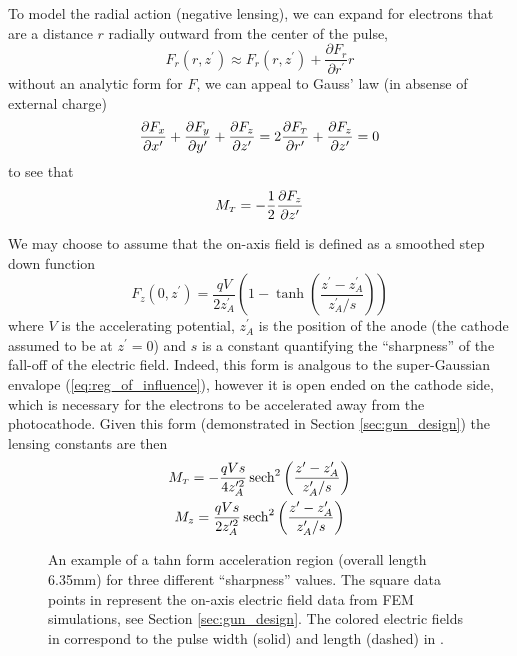 To model the radial action (negative lensing), we can expand for electrons that are a distance $r$ radially outward from the center of the pulse,
\begin{equation}
  F_r(r,z^{\prime}) \approx F_r(r,z^{\prime}) + \frac{\partial F_r}{\partial r^{\prime}} r
\end{equation}
without an analytic form for $F$, we can appeal to Gauss' law (in absense of external charge)
\begin{equation}
  \frac{\partial F_x}{\partial x^{\prime}} + \frac{\partial F_y}{\partial y^{\prime}} + \frac{\partial F_z}{\partial z^{\prime}} = 2 \frac{\partial F_{{\scriptscriptstyle T}}}{\partial r^{\prime}} + \frac{\partial F_z}{\partial z^{\prime}} = 0
\end{equation}
to see that
\begin{equation}
  M_{{\scriptscriptstyle T}} = -\frac{1}{2}\frac{\partial F_z}{\partial z^{\prime}}
\end{equation}

We may choose to assume that the on-axis field is defined as a smoothed step down function
\begin{equation}
  F_z(0,z^{\prime}) = \frac{qV}{2z^{\prime}_A} \left( 1 - \tanh \left( \frac{ z^{\prime} - z^{\prime}_A }{ z^{\prime}_A / s } \right) \right)
\end{equation}
where $V$ is the accelerating potential, $z^{\prime}_A$ is the position of the anode (the cathode assumed to be at $z^{\prime} = 0$) and $s$ is a constant quantifying the ``sharpness'' of the fall-off of the electric field.
Indeed, this form is analgous to the super-Gaussian envalope (\ref{eq:reg_of_influence}), however it is open ended on the cathode side, which is necessary for the electrons to be accelerated away from the photocathode.
Given this form (demonstrated in Section \ref{sec:gun_design}) the lensing constants are then
\begin{gather}
  M_{{\scriptscriptstyle T}} = -\frac{qVs}{4z^{\prime 2}_A} \operatorname{sech}^2 \left( \frac{z^{\prime} - z^{\prime}_A }{ z^{\prime}_A / s } \right) \\
  M_z = \frac{qVs}{2z^{\prime 2}_A} \operatorname{sech}^2 \left( \frac{z^{\prime} - z^{\prime}_A }{ z^{\prime}_A / s } \right)
\end{gather}

\begin{figure}
  \centerline{
    \subfloat[][]{
      \label{fig:field_on_axis}
      
    }
    \subfloat[][]{
      \label{fig:tanh_sharpness}
      
    }
  }
  \caption{
    An example of a tahn form acceleration region (overall length 6.35mm) for three different ``sharpness'' values.
    The square data points in \protect{} represent the on-axis electric field data from FEM simulations, see Section \ref{sec:gun_design}.
    The colored electric fields in \protect{} correspond to the pulse width (solid) and length (dashed) in \protect{}.
  }
  \label{fig:laser-cavity}
\end{figure}

